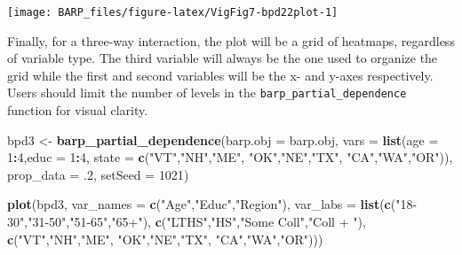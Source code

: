 \documentclass[]{article}
\newenvironment{Shaded}{\begin{snugshade}}{\end{snugshade}}
\newcommand{\KeywordTok}[1]{\textcolor[rgb]{0.13,0.29,0.53}{\textbf{#1}}}
\newcommand{\DataTypeTok}[1]{\textcolor[rgb]{0.13,0.29,0.53}{#1}}
\newcommand{\DecValTok}[1]{\textcolor[rgb]{0.00,0.00,0.81}{#1}}
\newcommand{\StringTok}[1]{\textcolor[rgb]{0.31,0.60,0.02}{#1}}
\newcommand{\OperatorTok}[1]{\textcolor[rgb]{0.81,0.36,0.00}{\textbf{#1}}}
\newcommand{\NormalTok}[1]{#1}
\begin{document}
\begin{center}\texttt{[image: BARP\_files/figure-latex/VigFig7-bpd22plot-1]} \end{center}

Finally, for a three-way interaction, the plot will be a grid of
heatmaps, regardless of variable type. The third variable will always be
the one used to organize the grid while the first and second variables
will be the x- and y-axes respectively. Users should limit the number of
levels in the \texttt{barp\_partial\_dependence} function for visual
clarity.

\begin{Shaded}
\begin{Highlighting}[]
\NormalTok{bpd3 <-}\StringTok{ }\KeywordTok{barp_partial_dependence}\NormalTok{(}\DataTypeTok{barp.obj =}\NormalTok{ barp.obj,}
                               \DataTypeTok{vars =} \KeywordTok{list}\NormalTok{(}\DataTypeTok{age =} \DecValTok{1}\OperatorTok{:}\DecValTok{4}\NormalTok{,}\DataTypeTok{educ =} \DecValTok{1}\OperatorTok{:}\DecValTok{4}\NormalTok{,}
                                           \DataTypeTok{state =} \KeywordTok{c}\NormalTok{(}\StringTok{"VT"}\NormalTok{,}\StringTok{"NH"}\NormalTok{,}\StringTok{"ME"}\NormalTok{,}
                                                     \StringTok{"OK"}\NormalTok{,}\StringTok{"NE"}\NormalTok{,}\StringTok{"TX"}\NormalTok{,}
                                                     \StringTok{"CA"}\NormalTok{,}\StringTok{"WA"}\NormalTok{,}\StringTok{"OR"}\NormalTok{)),}
                               \DataTypeTok{prop_data =}\NormalTok{ .}\DecValTok{2}\NormalTok{,}
                               \DataTypeTok{setSeed =} \DecValTok{1021}\NormalTok{)}
\end{Highlighting}
\end{Shaded}

\begin{Shaded}
\begin{Highlighting}[]
\KeywordTok{plot}\NormalTok{(bpd3,}
     \DataTypeTok{var_names =} \KeywordTok{c}\NormalTok{(}\StringTok{"Age"}\NormalTok{,}\StringTok{"Educ"}\NormalTok{,}\StringTok{"Region"}\NormalTok{),}
     \DataTypeTok{var_labs =} \KeywordTok{list}\NormalTok{(}\KeywordTok{c}\NormalTok{(}\StringTok{"18-30"}\NormalTok{,}\StringTok{"31-50"}\NormalTok{,}\StringTok{"51-65"}\NormalTok{,}\StringTok{"65+"}\NormalTok{),}
                     \KeywordTok{c}\NormalTok{(}\StringTok{"LTHS"}\NormalTok{,}\StringTok{"HS"}\NormalTok{,}\StringTok{"Some Coll"}\NormalTok{,}\StringTok{"Coll + "}\NormalTok{),}
                     \KeywordTok{c}\NormalTok{(}\StringTok{"VT"}\NormalTok{,}\StringTok{"NH"}\NormalTok{,}\StringTok{"ME"}\NormalTok{,}
                       \StringTok{"OK"}\NormalTok{,}\StringTok{"NE"}\NormalTok{,}\StringTok{"TX"}\NormalTok{,}
                       \StringTok{"CA"}\NormalTok{,}\StringTok{"WA"}\NormalTok{,}\StringTok{"OR"}\NormalTok{)))}
\end{Highlighting}
\end{Shaded}
\end{document}
